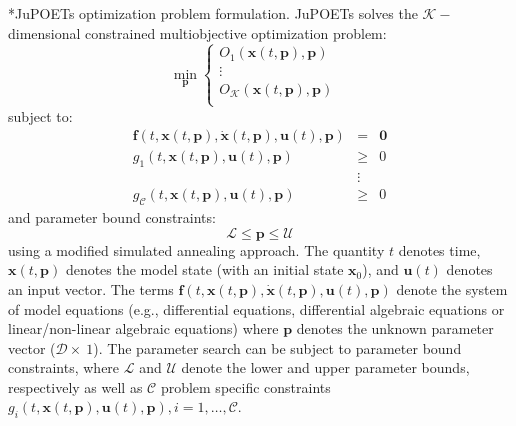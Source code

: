 \documentclass[12pt]{article}
\makeatletter
\renewcommand\subsection{\@startsection
	{subsection}{2}{0mm}
	{-0.05in}
	{-0.5\baselineskip}
	{\normalfont\normalsize\bfseries}}
\makeatother
\begin{document}
\subsection*{JuPOETs optimization problem formulation.}
JuPOETs solves the $\mathcal{K}-$dimensional constrained multiobjective optimization problem:
\begin{equation}
\min_{\mathbf{p}}
\begin{cases}
  O_{1}\left(\mathbf{x}(t,\mathbf{p}),\mathbf{p}\right) \\
  \vdots & \\
  O_{\mathcal{K}}\left(\mathbf{x}(t,\mathbf{p}),\mathbf{p}\right) \\
\end{cases}
\end{equation}
subject to:
\begin{eqnarray}\nonumber
  \mathbf{f}(t,\mathbf{x}(t,\mathbf{p}),\dot{\mathbf{x}}(t,\mathbf{p}),\mathbf{u}(t),\mathbf{p}) &=&\mathbf{0} \\\nonumber
  g_{1}\left(t,\mathbf{x}(t,\mathbf{p}),\mathbf{u}(t),\mathbf{p}\right) &\geq& 0 \\\nonumber
  &\vdots& \\\nonumber
  g_{\mathcal{C}}\left(t,\mathbf{x}(t,\mathbf{p}),\mathbf{u}(t),\mathbf{p}\right) &\geq& 0
\end{eqnarray}and parameter bound constraints:
\begin{equation}\nonumber
  \mathcal{L} \leq \mathbf{p} \leq \mathcal{U}
\end{equation}using a modified simulated annealing approach.
The quantity $t$ denotes time, $\mathbf{x}\left(t,\mathbf{p}\right)$ denotes the model state (with an initial state $\mathbf{x}_{0}$), and $\mathbf{u}(t)$ denotes an input vector.
The terms $\mathbf{f}(t,\mathbf{x}(t,\mathbf{p}),\dot{\mathbf{x}}(t,\mathbf{p}),\mathbf{u}(t),\mathbf{p})$ denote the system of model equations (e.g., differential equations,
differential algebraic equations or linear/non-linear algebraic equations) where $\mathbf{p}$ denotes the unknown parameter vector ($\mathcal{D}\times~1$).
The parameter search can be subject to parameter bound constraints, where $\mathcal{L}$ and $\mathcal{U}$ denote the lower and upper parameter bounds, respectively
as well as $\mathcal{C}$ problem specific constraints $g_i\left(t,\mathbf{x}(t,\mathbf{p}),\mathbf{u}(t),\mathbf{p}\right),i=1,\hdots,\mathcal{C}$.
\end{document}
